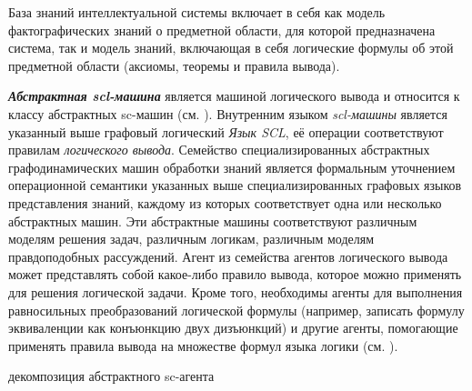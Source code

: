 База знаний интеллектуальной системы включает в себя как модель фактографических знаний о предметной области, для которой предназначена система, так и модель знаний, включающая в себя логические формулы об этой предметной области (аксиомы, теоремы и правила вывода).

\textit{\textbf{Абстрактная scl-машина}} является машиной логического вывода и относится к классу абстрактных sc-машин (см. ). Внутренним языком \textit{scl-машины} является указанный выше графовый логический \textit{Язык SCL}, её операции соответствуют правилам \textit{логического вывода}. Семейство специализированных абстрактных графодинамических машин обработки знаний является формальным уточнением операционной семантики указанных выше специализированных графовых языков представления знаний, каждому из которых соответствует одна или несколько абстрактных машин. Эти абстрактные машины соответствуют различным моделям решения задач, различным логикам, различным моделям правдоподобных рассуждений. 
Агент из семейства агентов логического вывода может представлять собой какое-либо правило вывода, которое можно применять для решения логической задачи. Кроме того, необходимы агенты для выполнения равносильных преобразований логической формулы (например, записать формулу эквиваленции как конъюнкцию двух дизъюнкций) и другие агенты, помогающие применять правила вывода на множестве формул языка логики (см. ).

\begin{SCn}
\begin{scnrelfromset}{декомпозиция абстрактного sc-агента}
\end{scnrelfromset}
\begin{scnindent}
\end{scnindent}
\end{SCn}

